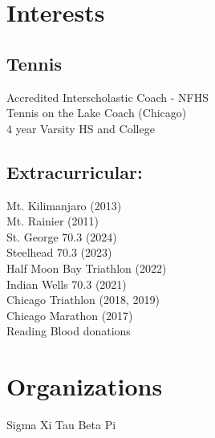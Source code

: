 \documentclass[]{deedy-resume}
\begin{document}
\begin{minipage}[t]{0.33\textwidth} %

\section{Interests}
\subsection{Tennis}
\vspace{5pt}
\textbullet{} Accredited Interscholastic Coach - NFHS \\
\textbullet{} Tennis on the Lake Coach (Chicago) \\
\textbullet{} 4 year Varsity HS and College
\sectionspace
\subsection{Extracurricular:}
\vspace{5pt}
\textbullet{} Mt. Kilimanjaro (2013) \\
\textbullet{} Mt. Rainier (2011) \\
\vspace{5pt}
\textbullet{} St. George 70.3 (2024) \\
\textbullet{} Steelhead 70.3 (2023) \\
\textbullet{} Half Moon Bay Triathlon (2022) \\
\textbullet{} Indian Wells 70.3 (2021) \\
\textbullet{} Chicago Triathlon (2018, 2019) \\
\textbullet{} Chicago Marathon (2017) \\
\vspace{5pt}
\textbullet{} Reading \textbullet{} Blood donations

\sectionspace
\section{Organizations}
\textbullet{} Sigma Xi
\textbullet{} Tau Beta Pi


\end{minipage}
\end{document}
